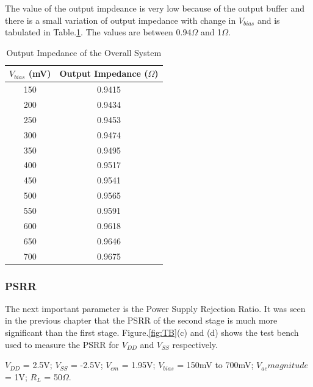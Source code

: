 The value of the output impdeance is very low because of the output buffer and there is a small variation of output impedance with change in $V_{bias}$ and is tabulated in Table.\ref{tab:ZOUT}. The values are between 0.94$\Omega$ and 1$\Omega$.
\begin{table} [H]
\centering
\begin{tabular}{@{}cc@{}}
\toprule
$V_{bias}$ (mV)		& Output Impedance ($\Omega$)	\\ \midrule
150					& 0.9415 \\
200					& 0.9434 \\
250					& 0.9453 \\
300					& 0.9474 \\
350					& 0.9495 \\
400					& 0.9517 \\
450					& 0.9541 \\
500					& 0.9565 \\
550					& 0.9591 \\
600					& 0.9618 \\
650					& 0.9646 \\
700 				& 0.9675 \\
\bottomrule
\end{tabular}
\caption{Output Impedance of the Overall System}
\label{tab:ZOUT}
\end{table}
\subsubsection{PSRR}
The next important parameter is the Power Supply Rejection Ratio. It was seen in the previous chapter that the PSRR of the second stage is much more significant than the first stage. Figure.\ref{fig:TB}(c) and (d) shows the test bench used to measure the PSRR for $V_{DD}$ and $V_{SS}$ respectively.

$V_{DD}$ = 2.5V; $V_{SS}$ = -2.5V; $V_{cm}$ = 1.95V; $V_{bias}$ = 150mV to 700mV;  $V_{ac} magnitude$ = 1V; $R_{L}$ = 50$\Omega$.

